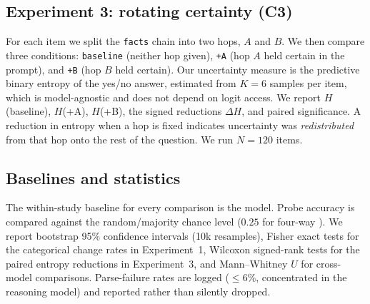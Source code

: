 \subsection{Experiment 3: rotating certainty (C3)}
\label{sec:exp3}

For each \strat item we split the \texttt{facts} chain into two hops, $A$ and $B$. We then
compare three conditions: \texttt{baseline} (neither hop given), \texttt{+A} (hop $A$ held
certain in the prompt), and \texttt{+B} (hop $B$ held certain). Our uncertainty measure is the
predictive binary entropy of the yes/no answer, estimated from $K=6$ samples per item, which
is model-agnostic and does not depend on logit access. We report $H$(baseline), $H$(+A),
$H$(+B), the signed reductions $\Delta H$, and paired significance. A reduction in entropy
when a hop is fixed indicates uncertainty was \emph{redistributed} from that hop onto the rest
of the question. We run $N=120$ items.

\subsection{Baselines and statistics}
\label{sec:stats}

The within-study baseline for every comparison is the \base model. Probe accuracy is compared
against the random/majority chance level ($0.25$ for four-way \arc). We report bootstrap 95\%
confidence intervals (10k resamples), Fisher exact tests for the categorical change rates in
Experiment~1, Wilcoxon signed-rank tests for the paired entropy reductions in Experiment~3,
and Mann--Whitney $U$ for cross-model comparisons. Parse-failure rates are logged ($\leq6\%$,
concentrated in the reasoning model) and reported rather than silently dropped.
